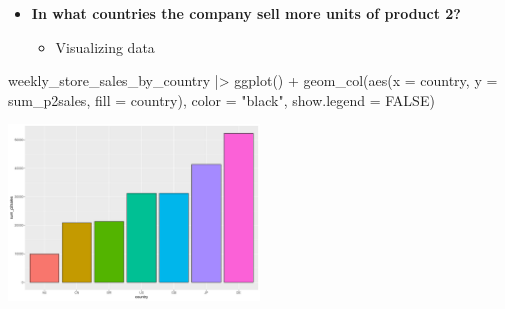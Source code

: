 \documentclass[
  ignorenonframetext,
]{beamer}
\newenvironment{Shaded}{\begin{snugshade}}{\end{snugshade}}
\newcommand{\AttributeTok}[1]{\textcolor[rgb]{0.40,0.45,0.13}{#1}}
\newcommand{\ConstantTok}[1]{\textcolor[rgb]{0.56,0.35,0.01}{#1}}
\newcommand{\FunctionTok}[1]{\textcolor[rgb]{0.28,0.35,0.67}{#1}}
\newcommand{\NormalTok}[1]{\textcolor[rgb]{0.00,0.23,0.31}{#1}}
\newcommand{\SpecialCharTok}[1]{\textcolor[rgb]{0.37,0.37,0.37}{#1}}
\newcommand{\StringTok}[1]{\textcolor[rgb]{0.13,0.47,0.30}{#1}}
\providecommand{\tightlist}{%
  \setlength{\itemsep}{0pt}\setlength{\parskip}{0pt}}\usepackage{longtable,booktabs,array}
\begin{document}
\begin{frame}[fragile]{}
\label{section-33}
\begin{itemize}
\item
  \textbf{In what countries the company sell more units of product 2?}

  \begin{itemize}
  \tightlist
  \item
    Visualizing data
  \end{itemize}
\end{itemize}

\tiny

\begin{Shaded}
\begin{Highlighting}[]
\NormalTok{weekly\_store\_sales\_by\_country }\SpecialCharTok{|\textgreater{}} \FunctionTok{ggplot}\NormalTok{() }\SpecialCharTok{+} 
  \FunctionTok{geom\_col}\NormalTok{(}\FunctionTok{aes}\NormalTok{(}\AttributeTok{x =}\NormalTok{ country, }\AttributeTok{y =}\NormalTok{ sum\_p2sales, }\AttributeTok{fill =}\NormalTok{ country),}
           \AttributeTok{color =} \StringTok{"black"}\NormalTok{, }\AttributeTok{show.legend =} \ConstantTok{FALSE}\NormalTok{)}
\end{Highlighting}
\end{Shaded}

\begin{center}
\includegraphics[width=0.5\textwidth,height=\textheight]{003_describing_data_files/figure-beamer/unnamed-chunk-32-1.pdf}
\end{center}
\end{frame}
\end{document}
